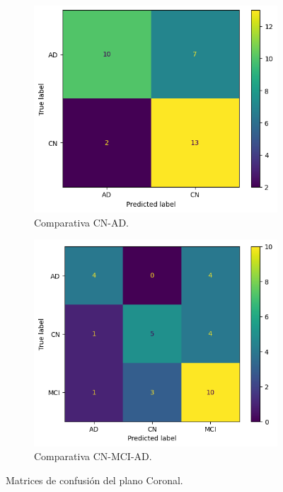 \begin{figure}[H]
    \centering
    \begin{subfigure}{0.4\textwidth}
        \includegraphics[width=\textwidth]{./imgs/resultados/coronal/CN_AD_cm_CORONAL}
        \caption{Comparativa CN-AD. }
        \label{fig:mc-coronal-cn-ad}
    \end{subfigure}
    \hspace*{\fill}
    \begin{subfigure}{0.4\textwidth}
        \includegraphics[width=\textwidth]{./imgs/resultados/coronal/CN_MCI_AD_cm_CORONAL}
        \caption{Comparativa CN-MCI-AD. }
        \label{fig:mc-coronal-cn-mci-ad}
    \end{subfigure}
    \caption{Matrices de confusión del plano Coronal.} \label{fig:mc-coronal}
\end{figure}

